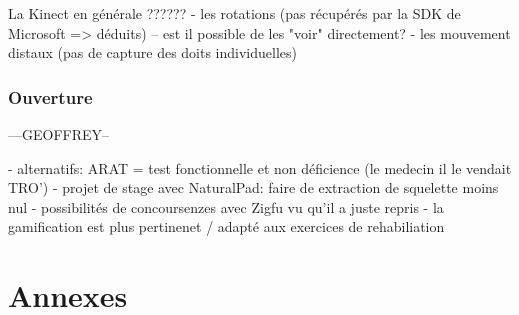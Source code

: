 \documentclass{report}
\begin{document}
		La Kinect en générale ??????
		- les rotations (pas récupérés par la SDK de Microsoft => déduits)
		  -- est il possible de les "voir" directement?
		- les mouvement distaux (pas de capture des doits individuelles)
		
		\section{Ouverture}		---GEOFFREY--
		
		- alternatifs: ARAT = test fonctionnelle et non déficience (le medecin il le vendait TRO')
		- projet de stage avec NaturalPad: faire de extraction de squelette moins nul
		- possibilités de concoursenzes avec Zigfu vu qu'il a juste repris 
		- la gamification est plus pertinenet / adapté aux exercices de rehabiliation 
		
\part{Annexes}
\end{document}
